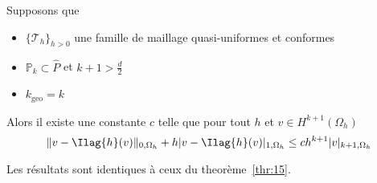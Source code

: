 \begin{theorem}
  \label{thr:16}
  Supposons que
  \begin{itemize}
  \item $\{\mathcal{T}_h\}_{h>0}$ une famille de maillage quasi-uniformes et conformes
  \item $\mathbb{P}_k \subset \hat{P}$ et $k+1 > \frac{d}{2}$
  \item $k_{\mathrm{geo}} = k$
  \end{itemize}
  Alors il existe une constante $c$ telle que  pour tout $h$ et $v \in
  H^{k+1}(\Omega_h)$
  \begin{equation}
    \label{eq:63}
    \|v - \Ilag{h}(v)\|_{0,\Omega_h} + h |v - \Ilag{h}(v)|_{1,\Omega_h} \leq
    c h^{k+1} |v|_{k+1,\Omega_h}
  \end{equation}
\end{theorem}
\begin{remark}
  \label{rem:23}
  Les résultats sont identiques à ceux du theorème~\ref{thr:15}.
\end{remark}


